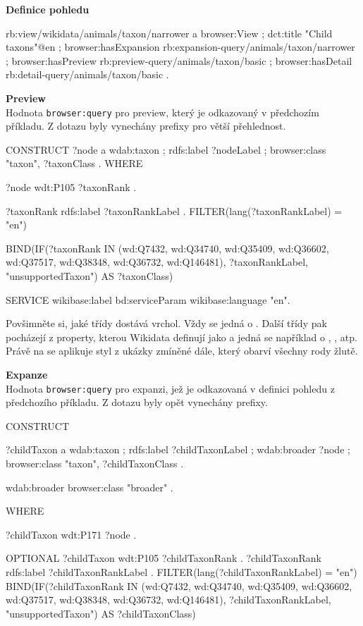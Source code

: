 \begin{prikl}
\medskip

\textbf{Definice pohledu}
\begin{code}
rb:view/wikidata/animals/taxon/narrower a browser:View ;
    dct:title "Child taxons"@en ;
    browser:hasExpansion rb:expansion-query/animals/taxon/narrower ;
    browser:hasPreview rb:preview-query/animals/taxon/basic ;
    browser:hasDetail rb:detail-query/animals/taxon/basic .
\end{code}

\textbf{Preview} \\
Hodnota \texttt{browser:query} pro preview, který je odkazovaný v předchozím příkladu. Z dotazu byly vynechány prefixy pro větší přehlednost.
\begin{code}
CONSTRUCT {
    ?node a wdab:taxon ;
          rdfs:label ?nodeLabel ;
          browser:class "taxon",
                        ?taxonClass .
} WHERE {
    ?node wdt:P105 ?taxonRank .

    ?taxonRank rdfs:label ?taxonRankLabel .
    FILTER(lang(?taxonRankLabel) = "en")

    BIND(IF(?taxonRank IN (wd:Q7432, wd:Q34740, wd:Q35409, wd:Q36602,
        wd:Q37517, wd:Q38348, wd:Q36732, wd:Q146481), ?taxonRankLabel,
        "unsupportedTaxon") AS ?taxonClass)

    SERVICE wikibase:label { bd:serviceParam wikibase:language "en". }
}
\end{code}
Povšimněte si, jaké třídy dostává vrchol. Vždy se jedná o . Další třídy pak pocházejí z property, kterou Wikidata definují jako  a jedná se například o , ,  atp. Právě na  se aplikuje styl z ukázky zmíněné dále, který obarví všechny rody žlutě.

\medskip

\textbf{Expanze} \\
Hodnota \texttt{browser:query} pro expanzi, jež je odkazovaná v definici pohledu z předchozího příkladu. Z dotazu byly opět vynechány prefixy.
\begin{code}
CONSTRUCT {
    ?childTaxon a wdab:taxon ;
                rdfs:label ?childTaxonLabel ;
                wdab:broader ?node ;
                browser:class "taxon",
                              ?childTaxonClass .

    wdab:broader browser:class "broader" .
} WHERE {
    ?childTaxon wdt:P171 ?node .

    OPTIONAL {
        ?childTaxon wdt:P105 ?childTaxonRank .
        ?childTaxonRank rdfs:label ?childTaxonRankLabel .
        FILTER(lang(?childTaxonRankLabel) = "en")
        BIND(IF(?childTaxonRank IN (wd:Q7432, wd:Q34740, wd:Q35409,
            wd:Q36602, wd:Q37517, wd:Q38348, wd:Q36732, wd:Q146481),
            ?childTaxonRankLabel, "unsupportedTaxon") AS
            ?childTaxonClass)
    }

}
\end{code}
\end{prikl}
